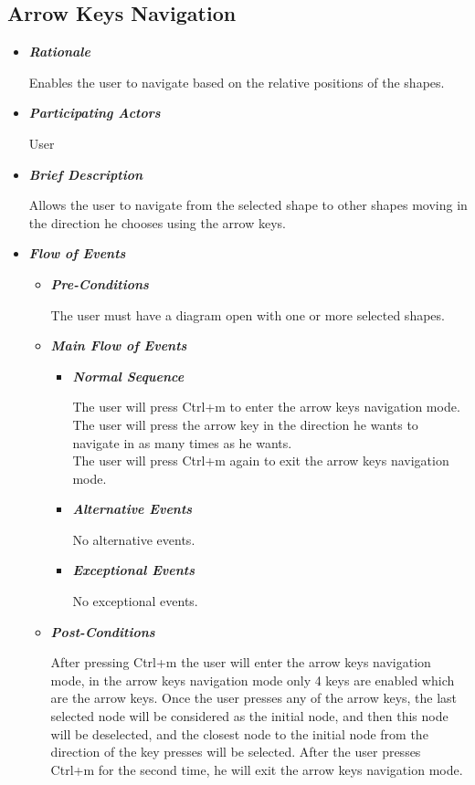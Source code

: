 \subsection{Arrow Keys Navigation}
\begin{itemize}

\item {\bf \em Rationale}
\par \noindent
Enables the user to navigate based on the relative positions of the shapes.

\item {\bf \em Participating Actors}
\par \noindent
User

\item {\bf \em Brief Description}
\par \noindent
Allows the user to navigate from the selected shape to other shapes moving in the direction he chooses using the arrow keys.

\item {\bf \em Flow of Events}
\begin{itemize}

\item {\bf \em Pre-Conditions}
\par \noindent
The user must have a diagram open with one or more selected shapes.

\item {\bf \em Main Flow of Events}

\begin{itemize}

\item {\bf \em Normal Sequence}
\par \noindent
The user will press Ctrl+m to enter the arrow keys navigation mode.\\
The user will press the arrow key in the direction he wants to navigate in as many times as he wants.\\
The user will press Ctrl+m again to exit the arrow keys navigation mode.


\item {\bf \em Alternative Events}
\par \noindent
No alternative events.

\item {\bf \em Exceptional Events}
\par \noindent
No exceptional events.

\end{itemize}

\item {\bf \em Post-Conditions}
\par \noindent
After pressing Ctrl+m the user will enter the arrow keys navigation mode, in the arrow keys navigation mode only 4 keys are enabled which are the arrow keys. Once the user presses any of the arrow keys, the last selected node will be considered as the initial node, and then this node will be deselected, and the closest node to the initial node from the direction of the key presses will be selected. After the user presses Ctrl+m for the second time, he will exit the arrow keys navigation mode.


\end{itemize}
\end{itemize}
